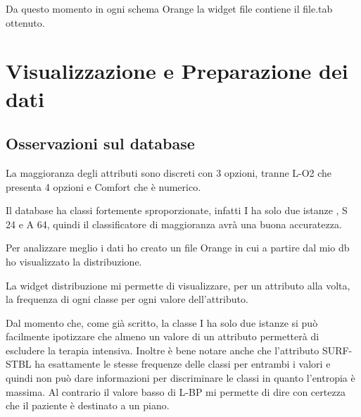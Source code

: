 \documentclass[a4paper, 12p]{report}
\begin{document}
\noindent Da questo momento in ogni schema Orange la widget file contiene il file.tab ottenuto.

\section{Visualizzazione e Preparazione dei dati}

\subsection{Osservazioni sul database}

La maggioranza degli attributi sono discreti con 3 opzioni, tranne L-O2 che presenta 4 opzioni e Comfort che è numerico.

\noindent Il database ha classi fortemente sproporzionate, infatti I ha solo due istanze , S 24 e A 64, quindi il classificatore di maggioranza avrà una buona accuratezza.

\noindent Per analizzare meglio i dati ho creato un  file Orange in cui a partire dal mio db ho visualizzato la distribuzione.

La widget distribuzione mi permette di visualizzare, per un attributo alla volta, la frequenza di ogni classe per ogni valore dell'attributo. 

\noindent Dal momento che, come già scritto, la classe I ha solo due istanze si può facilmente ipotizzare che almeno un valore di un attributo permetterà di escludere la terapia intensiva. Inoltre è bene notare anche che l'attributo SURF-STBL ha esattamente le stesse frequenze delle classi per entrambi i valori e quindi non può dare informazioni per discriminare le classi in quanto l'entropia è massima. Al contrario il valore basso di L-BP mi permette di dire con certezza che il paziente è destinato a un piano.
\end{document}
